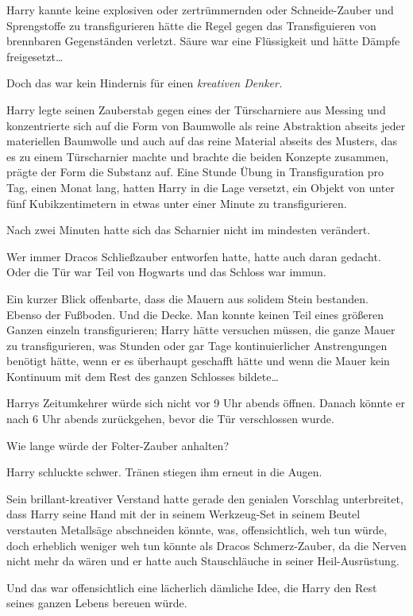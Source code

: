 {Harry kannte keine explosiven oder zertrümmernden oder Schneide-Zauber und Sprengstoffe zu transfigurieren hätte die Regel gegen das Transfiguieren von brennbaren Gegenständen verletzt. Säure war eine Flüssigkeit und hätte Dämpfe freigesetzt…

Doch das war kein Hindernis für einen \emph{kreativen Denker.}

Harry legte seinen Zauberstab gegen eines der Türscharniere aus Messing und konzentrierte sich auf die Form von Baumwolle als reine Abstraktion abseits jeder materiellen Baumwolle und auch auf das reine Material abseits des Musters, das es zu einem Türscharnier machte und brachte die beiden Konzepte zusammen, prägte der Form die Substanz auf. Eine Stunde Übung in Transfiguration pro Tag, einen Monat lang, hatten Harry in die Lage versetzt, ein Objekt von unter fünf Kubikzentimetern in etwas unter einer Minute zu transfigurieren.

Nach zwei Minuten hatte sich das Scharnier nicht im mindesten verändert.

Wer immer Dracos Schließzauber entworfen hatte, hatte auch daran gedacht. Oder die Tür war Teil von Hogwarts und das Schloss war immun.

Ein kurzer Blick offenbarte, dass die Mauern aus solidem Stein bestanden. Ebenso der Fußboden. Und die Decke. Man konnte keinen Teil eines größeren Ganzen einzeln transfigurieren; Harry hätte versuchen müssen, die ganze Mauer zu transfigurieren, was Stunden oder gar Tage kontinuierlicher Anstrengungen benötigt hätte, wenn er es überhaupt geschafft hätte und wenn die Mauer kein Kontinuum mit dem Rest des ganzen Schlosses bildete…

Harrys Zeitumkehrer würde sich nicht vor 9 Uhr abends öffnen. Danach könnte er nach 6 Uhr abends zurückgehen, bevor die Tür verschlossen wurde.

Wie lange würde der Folter-Zauber anhalten?

Harry schluckte schwer. Tränen stiegen ihm erneut in die Augen.

Sein brillant-kreativer Verstand hatte gerade den genialen Vorschlag unterbreitet, dass Harry seine Hand mit der in seinem Werkzeug-Set in seinem Beutel verstauten Metallsäge abschneiden könnte, was, offensichtlich, weh tun würde, doch erheblich weniger weh tun könnte als Dracos Schmerz-Zauber, da die Nerven nicht mehr da wären und er hatte auch Stauschläuche in seiner Heil-Ausrüstung.

Und das war offensichtlich eine lächerlich dämliche Idee, die Harry den Rest seines ganzen Lebens bereuen würde.

}
